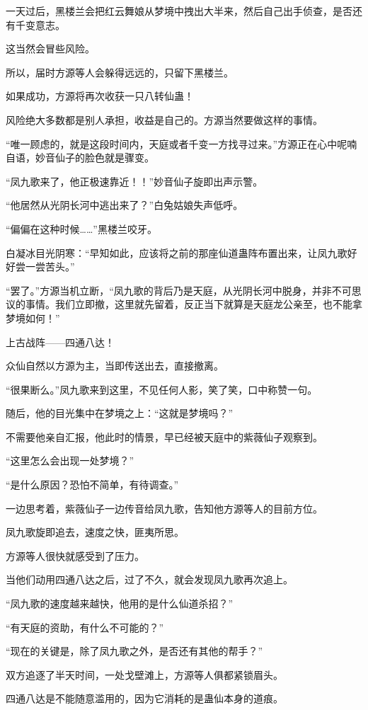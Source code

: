 \begin{this_body}
一天过后，黑楼兰会把红云舞娘从梦境中拽出大半来，然后自己出手侦查，是否还有千变意志。

这当然会冒些风险。

所以，届时方源等人会躲得远远的，只留下黑楼兰。

如果成功，方源将再次收获一只八转仙蛊！

风险绝大多数都是别人承担，收益是自己的。方源当然要做这样的事情。

“唯一顾虑的，就是这段时间内，天庭或者千变一方找寻过来。”方源正在心中呢喃自语，妙音仙子的脸色就是骤变。

“凤九歌来了，他正极速靠近！！”妙音仙子旋即出声示警。

“他居然从光阴长河中逃出来了？”白兔姑娘失声低呼。

“偏偏在这种时候……”黑楼兰咬牙。

白凝冰目光阴寒：“早知如此，应该将之前的那座仙道蛊阵布置出来，让凤九歌好好尝一尝苦头。”

“罢了。”方源当机立断，“凤九歌的背后乃是天庭，从光阴长河中脱身，并非不可思议的事情。我们立即撤，这里就先留着，反正当下就算是天庭龙公亲至，也不能拿梦境如何！”

上古战阵——四通八达！

众仙自然以方源为主，当即传送出去，直接撤离。

“很果断么。”凤九歌来到这里，不见任何人影，笑了笑，口中称赞一句。

随后，他的目光集中在梦境之上：“这就是梦境吗？”

不需要他亲自汇报，他此时的情景，早已经被天庭中的紫薇仙子观察到。

“这里怎么会出现一处梦境？”

“是什么原因？恐怕不简单，有待调查。”

一边思考着，紫薇仙子一边传音给凤九歌，告知他方源等人的目前方位。

凤九歌旋即追去，速度之快，匪夷所思。

方源等人很快就感受到了压力。

当他们动用四通八达之后，过了不久，就会发现凤九歌再次追上。

“凤九歌的速度越来越快，他用的是什么仙道杀招？”

“有天庭的资助，有什么不可能的？”

“现在的关键是，除了凤九歌之外，是否还有其他的帮手？”

双方追逐了半天时间，一处戈壁滩上，方源等人俱都紧锁眉头。

四通八达是不能随意滥用的，因为它消耗的是蛊仙本身的道痕。


\end{this_body}
